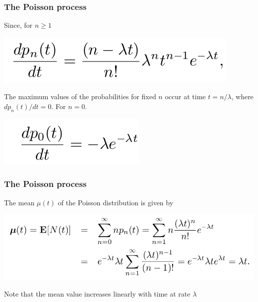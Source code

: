\documentclass[spanish]{beamer}
\begin{document}
\begin{frame}
\frametitle{The Poisson process}
Since, for $n \geq 1$

\begin{center}
\includegraphics[scale=0.4]{im5}
\end{center}

The maximum values of the probabilities for fixed $n$ occur at time $t = n/\lambda$, where $dp_{n} (t)/dt = 0$. For $n = 0$.

\begin{center}
\includegraphics[scale=0.4]{im6}
\end{center}
\end{frame}
\begin{frame}
\frametitle{The Poisson process}
The mean $\mu (t)$ of the Poisson distribution is given by


\begin{center}
\includegraphics[scale=0.38]{im7}
\end{center}
Note that the mean value increases linearly with time at rate $\lambda$
   \end{frame}
\end{document}
